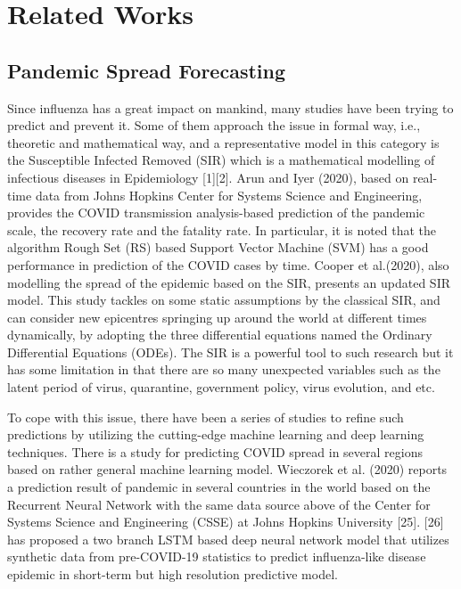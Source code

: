 \section{Related Works}
\subsection{Pandemic Spread Forecasting}
Since influenza has a great impact on mankind, many studies have been trying
to predict and prevent it. Some of them approach the issue in formal way,
i.e., theoretic and mathematical way, and a representative model in this
category is the Susceptible Infected Removed (SIR) which is a mathematical
modelling of infectious diseases in Epidemiology [1][2]. Arun and Iyer
(2020), based on real-time data from Johns Hopkins Center for Systems Science
and Engineering, provides the COVID transmission analysis-based prediction of
the pandemic scale, the recovery rate and the fatality rate. In particular,
it is noted that the algorithm Rough Set (RS) based Support Vector Machine
(SVM) has a good performance in prediction of the COVID cases by time. Cooper
et al.(2020), also modelling the spread of the epidemic based on the SIR,
presents an updated SIR model. This study tackles on some static assumptions
by the classical SIR, and can consider new epicentres springing up around the
world at different times dynamically, by adopting the three differential
equations named the Ordinary Differential Equations (ODEs). The SIR is a
powerful tool to such research but it has some limitation in that there are
so many unexpected variables such as the latent period of virus, quarantine,
government policy, virus evolution, and etc.

To cope with this issue, there have been a series of studies to refine such
predictions by utilizing the cutting-edge machine learning and deep learning
techniques. There is a study for predicting COVID spread in several regions
based on rather general machine learning model. Wieczorek et al.
(2020) reports a prediction result of pandemic in several countries in the
world based on the Recurrent Neural Network with the same data source above
of the Center for Systems Science and Engineering (CSSE) at Johns Hopkins
University [25]. [26] has proposed a two branch LSTM based deep neural
network model that utilizes synthetic data from pre-COVID-19 statistics to
predict influenza-like disease epidemic in short-term but high resolution
predictive model.

